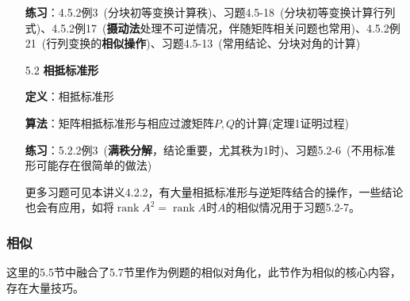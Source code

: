 \documentclass[a4paper,UTF8,fontset=windows]{ctexart}
\DeclareMathOperator{\rank}{rank}
\newcommand*{\note}{\noindent *}
\begin{document}
\begin{enumerate}
    \textbf{练习}：4.5.2例3\ (分块初等变换计算秩)、习题4.5-18\ (分块初等变换计算行列式)、4.5.2例17\ (\textbf{摄动法}处理不可逆情况，伴随矩阵相关问题也常用)、4.5.2例21\ (行列变换的\textbf{相似操作})、习题4.5-13\ (常用结论、分块对角的计算)

    \item[5.2] \textbf{相抵标准形}
    
    \textbf{定义}：相抵标准形

    \textbf{算法}：矩阵相抵标准形与相应过渡矩阵$P,Q$的计算(定理1证明过程)

    \textbf{练习}：5.2.2例3\ (\textbf{满秩分解}，结论重要，尤其秩为1时)、习题5.2-6\ (不用标准形可能存在很简单的做法)

    \note 更多习题可见本讲义4.2.2，有大量相抵标准形与逆矩阵结合的操作，一些结论也会有应用，如将$\rank A^2=\rank A$时$A$的相似情况用于习题5.2-7。
\end{enumerate}

\subsubsection{相似}
\note 这里的5.5节中融合了5.7节里作为例题的相似对角化，此节作为相似的核心内容，存在大量技巧。
\end{document}
